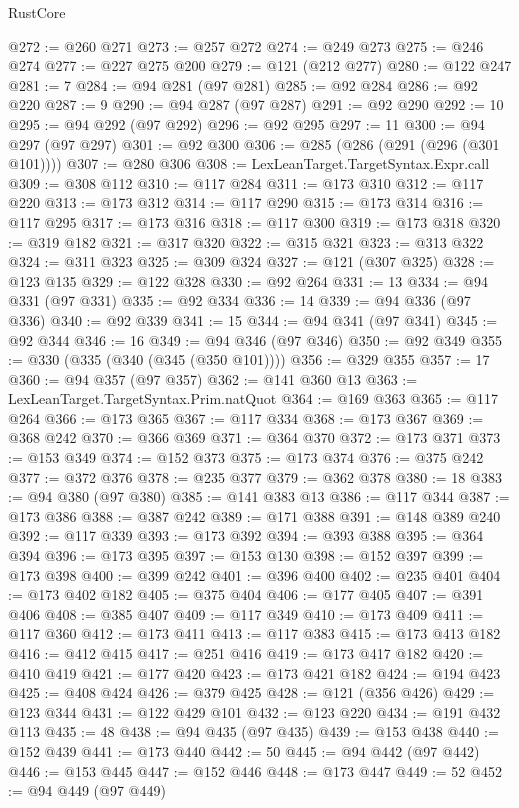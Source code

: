 \begin{lexlean}{RustCore}
\begin{coremodule}
@272 := @260 @271
@273 := @257 @272
@274 := @249 @273
@275 := @246 @274
@277 := @227 @275 @200
@279 := @121 (@212 @277)
@280 := @122 @247
@281 := 7
@284 := @94 @281 (@97 @281)
@285 := @92 @284
@286 := @92 @220
@287 := 9
@290 := @94 @287 (@97 @287)
@291 := @92 @290
@292 := 10
@295 := @94 @292 (@97 @292)
@296 := @92 @295
@297 := 11
@300 := @94 @297 (@97 @297)
@301 := @92 @300
@306 := @285 (@286 (@291 (@296 (@301 @101))))
@307 := @280 @306
@308 := LexLeanTarget.TargetSyntax.Expr.call
@309 := @308 @112
@310 := @117 @284
@311 := @173 @310
@312 := @117 @220
@313 := @173 @312
@314 := @117 @290
@315 := @173 @314
@316 := @117 @295
@317 := @173 @316
@318 := @117 @300
@319 := @173 @318
@320 := @319 @182
@321 := @317 @320
@322 := @315 @321
@323 := @313 @322
@324 := @311 @323
@325 := @309 @324
@327 := @121 (@307 @325)
@328 := @123 @135
@329 := @122 @328
@330 := @92 @264
@331 := 13
@334 := @94 @331 (@97 @331)
@335 := @92 @334
@336 := 14
@339 := @94 @336 (@97 @336)
@340 := @92 @339
@341 := 15
@344 := @94 @341 (@97 @341)
@345 := @92 @344
@346 := 16
@349 := @94 @346 (@97 @346)
@350 := @92 @349
@355 := @330 (@335 (@340 (@345 (@350 @101))))
@356 := @329 @355
@357 := 17
@360 := @94 @357 (@97 @357)
@362 := @141 @360 @13
@363 := LexLeanTarget.TargetSyntax.Prim.natQuot
@364 := @169 @363
@365 := @117 @264
@366 := @173 @365
@367 := @117 @334
@368 := @173 @367
@369 := @368 @242
@370 := @366 @369
@371 := @364 @370
@372 := @173 @371
@373 := @153 @349
@374 := @152 @373
@375 := @173 @374
@376 := @375 @242
@377 := @372 @376
@378 := @235 @377
@379 := @362 @378
@380 := 18
@383 := @94 @380 (@97 @380)
@385 := @141 @383 @13
@386 := @117 @344
@387 := @173 @386
@388 := @387 @242
@389 := @171 @388
@391 := @148 @389 @240
@392 := @117 @339
@393 := @173 @392
@394 := @393 @388
@395 := @364 @394
@396 := @173 @395
@397 := @153 @130
@398 := @152 @397
@399 := @173 @398
@400 := @399 @242
@401 := @396 @400
@402 := @235 @401
@404 := @173 @402 @182
@405 := @375 @404
@406 := @177 @405
@407 := @391 @406
@408 := @385 @407
@409 := @117 @349
@410 := @173 @409
@411 := @117 @360
@412 := @173 @411
@413 := @117 @383
@415 := @173 @413 @182
@416 := @412 @415
@417 := @251 @416
@419 := @173 @417 @182
@420 := @410 @419
@421 := @177 @420
@423 := @173 @421 @182
@424 := @194 @423
@425 := @408 @424
@426 := @379 @425
@428 := @121 (@356 @426)
@429 := @123 @344
@431 := @122 @429 @101
@432 := @123 @220
@434 := @191 @432 @113
@435 := 48
@438 := @94 @435 (@97 @435)
@439 := @153 @438
@440 := @152 @439
@441 := @173 @440
@442 := 50
@445 := @94 @442 (@97 @442)
@446 := @153 @445
@447 := @152 @446
@448 := @173 @447
@449 := 52
@452 := @94 @449 (@97 @449)

\end{coremodule}
\end{lexlean}
